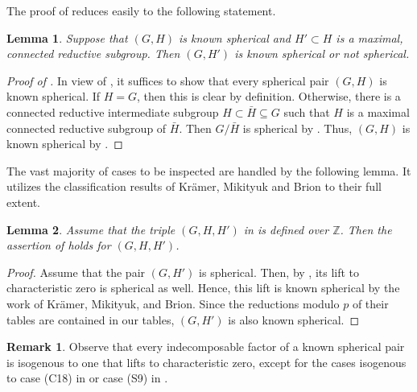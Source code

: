 \documentclass[12pt]{amsart}
\newcommand\BBZ{{\mathbb Z}}
\numberwithin{equation}{section}
\newtheorem{lemma}[lemma]{Lemma}
\theoremstyle{definition}
\newtheorem{remark}[remark]{Remark}
\begin{document}
The proof of  reduces easily to the following
statement.

\begin{lemma}
  \label{lem:1}
  Suppose that $(G,H)$ is known spherical and $H'\subset H$ is a maximal,
  connected reductive subgroup. Then $(G,H')$ is known spherical or
  not spherical.
\end{lemma}

\begin{proof}[Proof of ] 
  In view of , it suffices to show that every spherical
  pair $(G,H)$ is known spherical. If $H=G$, then this is clear by
  definition. Otherwise, there is a connected reductive intermediate
  subgroup $H \subset \bar H \subseteq G$ such that $H$ is a maximal
  connected reductive subgroup of $\bar H$. Then $G/\bar H$ is
  spherical by . Thus, $(G,H)$ is known spherical
  by .
\end{proof}

The vast majority of cases to be inspected are handled by the following
lemma. It utilizes the classification results of Krämer, Mikityuk and Brion
to their full extent.

\begin{lemma}
  \label{lem:2}
  Assume that the triple $(G,H,H')$ in  is defined over
  $\BBZ$. Then the assertion of  holds for $(G,H,H')$.
\end{lemma}

\begin{proof}
  Assume that the pair $(G,H')$ is spherical. Then, by , its
  lift to characteristic zero is spherical as well. Hence, this lift is
  known spherical by the work of Krämer, Mikityuk, and Brion. Since the
  reductions modulo $p$ of their tables are contained in our tables, $(G,H')$
  is also known spherical.
\end{proof}

\begin{remark}
  \label{rem:1}
  Observe that every indecomposable factor of a known spherical pair
  is isogenous to one that lifts to characteristic zero, except for
  the cases isogenous to case (C18) in
   or case (S9) in .
\end{remark}
\end{document}
